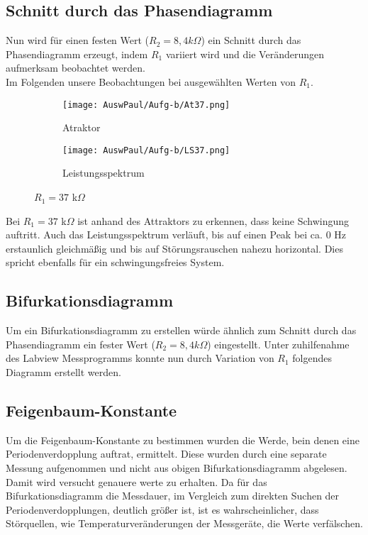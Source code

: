 \newpage

\subsection{Schnitt durch das Phasendiagramm}
Nun wird für einen festen Wert (\(R_2 = 8,4 k\Omega\)) ein Schnitt durch das Phasendiagramm erzeugt, indem \(R_1\) variiert wird und die Veränderungen aufmerksam beobachtet werden. \\
Im Folgenden unsere Beobachtungen bei ausgewählten Werten von \(R_1\).\\
\newpage
\begin{figure}[h]
    \centering
    \begin{subfigure}[b]{0.45\textwidth}
        \centering
        \texttt{[image: AuswPaul/Aufg-b/At37.png]}
        \caption{Atraktor}
    \end{subfigure}
    \hfill
    \begin{subfigure}[b]{0.45\textwidth}
        \centering
        \texttt{[image: AuswPaul/Aufg-b/LS37.png]}
        \caption{Leistungsspektrum}
    \end{subfigure}
    \caption{$R_1 = 37$ k$\Omega$}
\end{figure}

Bei $R_1 = 37$ k$\Omega$ ist anhand des Attraktors zu erkennen, dass keine Schwingung auftritt. Auch das Leistungsspektrum verläuft, bis auf einen Peak bei ca. 0 Hz erstaunlich gleichmäßig und bis auf Störungsrauschen nahezu horizontal. Dies spricht ebenfalls für ein schwingungsfreies System.


\newpage
\subsection{Bifurkationsdiagramm}
Um ein Bifurkationsdiagramm zu erstellen würde ähnlich zum Schnitt durch das Phasendiagramm ein fester Wert (\(R_2=8,4k \Omega\)) eingestellt. Unter zuhilfenahme des Labview Messprogramms konnte nun durch Variation von \(R_1\) folgendes Diagramm erstellt werden.



\subsection{Feigenbaum-Konstante}

Um die Feigenbaum-Konstante zu bestimmen wurden die Werde, bein denen eine Periodenverdopplung auftrat, ermittelt. Diese wurden durch eine separate Messung aufgenommen und nicht aus obigen Bifurkationsdiagramm abgelesen. Damit wird versucht genauere werte zu erhalten. Da für das Bifurkationsdiagramm die Messdauer, im Vergleich zum direkten Suchen der Periodenverdopplungen, deutlich größer ist, ist es wahrscheinlicher, dass Störquellen, wie Temperaturveränderungen der Messgeräte, die Werte verfälschen.\\

